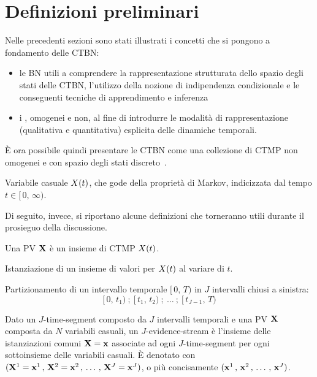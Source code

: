 \section{Definizioni preliminari}
\label{sec:Definizioni preliminari}
Nelle precedenti sezioni sono stati illustrati i concetti che si pongono a fondamento delle \acl{CTBN}:
\begin{itemize}
    \item le \acl{BN} utili a comprendere la rappresentazione strutturata dello spazio degli stati delle \acs{CTBN}, l'utilizzo della nozione di indipendenza condizionale e le conseguenti tecniche di apprendimento e inferenza
    \item i \mprocess{}, omogenei e non, al fine di introdurre le modalità di rappresentazione (qualitativa e quantitativa) esplicita delle dinamiche temporali.
\end{itemize}

\`E ora possibile quindi presentare le \acl{CTBN} come una collezione di \ac{CTMP} non omogenei e con spazio degli stati discreto~\cite{Nodelman2002}.

\begin{definizione}
Variabile casuale $\mathnormal{X}(t)$, che gode della proprietà di Markov, indicizzata dal tempo $t\in[\,0,\,\infty)$.
\end{definizione}

Di seguito, invece, si riportano alcune definizioni che torneranno utili durante il prosieguo della discussione.

\begin{definizione}[\ACL{PV}]
    Una \acf{PV} $\mathbf{X}$ è un insieme di \acl{CTMP} $\mathnormal{X}(t)$.
\end{definizione}

\begin{definizione}[Traiettoria]
    Istanziazione di un insieme di valori per $\mathnormal{X}(t)$ al variare di $t$.
\end{definizione}

\begin{definizione}
Partizionamento di un intervallo temporale $[\,0,\,T)$ in $J$ intervalli chiusi a sinistra:
\[
[\,0,\,t_1)\:;\:[\,t_1,\,t_2)\:;\:\dotsc\:;\:[\,t_{J-1},\,T)
\]
\end{definizione}

\begin{definizione}
Dato un $J$-time-segment composto da $J$ intervalli temporali e una \acl{PV} $\mathbf{X}$ composta da $N$ variabili casuali, un $J$-evidence-stream è l'insieme delle istanziazioni comuni $\mathbf{X}=\mathbf{x}$ associate ad ogni $J$-time-segment per ogni sottoinsieme delle variabili casuali. \`E denotato con $(\mathbf{X}^1=\mathbf{x}^1\,,\,\mathbf{X}^2=\mathbf{x}^2\,,\,\dotsc\,,\,\mathbf{X}^J=\mathbf{x}^J)$, o più concisamente $(\mathbf{x}^1\,,\,\mathbf{x}^2\,,\,\dotsc\,,\,\mathbf{x}^J)$.
\end{definizione}

